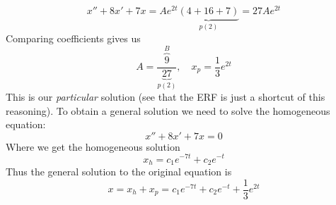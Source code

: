\documentclass{report}
\begin{document}
\begin{equation*}
x''+8x'+7x=Ae^{2t}\underbrace{(4+16+7)}_{p(2)}=27Ae^{2t}
\end{equation*}
Comparing coefficients gives us
\begin{equation*}
A=\frac{\overbrace{9}^{B}}{\underbrace{27}_{p(2)}},\quad x_p=\frac{1}{3}e^{2t}
\end{equation*}
This is our \textit{particular} solution (see that the ERF is just a shortcut of this reasoning). To obtain 
a general solution we need to solve the homogeneous equation:
\begin{equation*}
x''+8x'+7x=0
\end{equation*}
Where we get the homogeneous solution
\begin{equation*}
x_h=c_1e^{-7t}+c_2e^{-t}
\end{equation*}
Thus the general solution to the original equation is
\begin{equation*}
x=x_h+x_p=c_1e^{-7t}+c_2e^{-t}+\frac{1}{3}e^{2t}
\end{equation*}
\newpage
\end{document}
